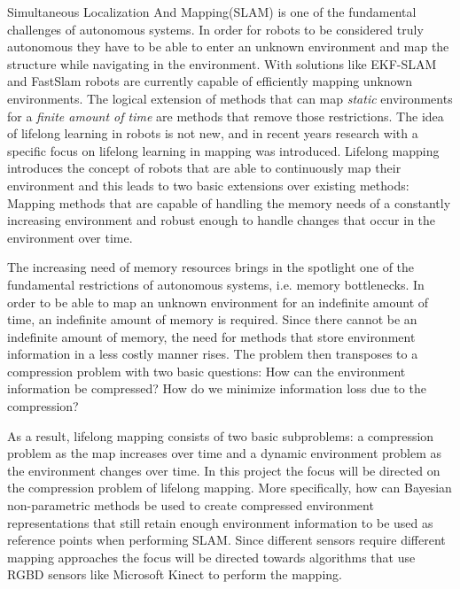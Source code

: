 \documentclass[twoside,hidelinks]{article}
\begin{document}
Simultaneous Localization And Mapping(SLAM) is one of the fundamental challenges of autonomous systems\cite{probRobs}. In order for robots to be considered truly autonomous they have to be able to enter an unknown environment and map the structure while navigating in the environment. With solutions like EKF-SLAM\cite{ekf} and FastSlam\cite{SLAM} robots are currently capable of efficiently mapping unknown environments. The logical extension of methods that can map \textit{static} environments for a \textit{finite amount of time} are methods that remove those restrictions. The idea of lifelong learning in robots is not new\cite{liflonglearning}, and in recent years research with a specific focus on lifelong learning in mapping\cite{lifelongmaps} was introduced.  Lifelong mapping introduces the concept of robots that are able to continuously map their environment and this leads to two basic extensions over existing methods: Mapping methods that are capable of handling the memory needs of a constantly increasing environment and robust enough to handle changes that occur in the environment over time. 

The increasing need of memory resources brings in the spotlight one of the fundamental restrictions of autonomous systems, i.e. memory bottlenecks. In order to be able to map an unknown environment for an indefinite amount of time, an indefinite amount of memory is required. Since there cannot be an indefinite amount of memory, the need for methods that store environment information in a less costly manner rises. The problem then transposes to a compression problem with two basic questions: How can the environment information be compressed? How do we minimize information loss due to the compression?

As a result, lifelong mapping consists of two basic subproblems: a compression problem as the map increases over time and a dynamic environment problem as the environment changes over time\cite{aishalong}. In this project the focus will be directed on the compression problem of lifelong mapping. More specifically, how can Bayesian non-parametric methods be used to create compressed environment representations that still retain enough environment information to be used as reference points when performing SLAM. Since different sensors require different mapping approaches the focus will be directed towards algorithms that use RGBD sensors like Microsoft Kinect to perform the mapping. 
\end{document}
